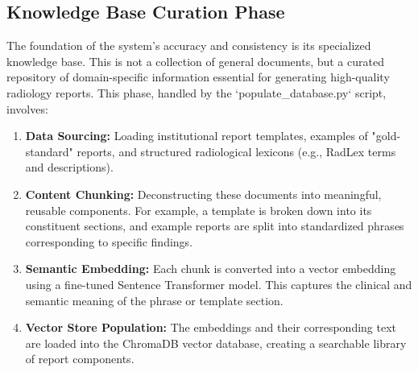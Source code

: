 \subsection{Knowledge Base Curation Phase}
The foundation of the system's accuracy and consistency is its specialized knowledge base. This is not a collection of general documents, but a curated repository of domain-specific information essential for generating high-quality radiology reports. This phase, handled by the `populate\_database.py` script, involves:
\begin{enumerate}
    \item \textbf{Data Sourcing:} Loading institutional report templates, examples of "gold-standard" reports, and structured radiological lexicons (e.g., RadLex terms and descriptions).
    \item \textbf{Content Chunking:} Deconstructing these documents into meaningful, reusable components. For example, a template is broken down into its constituent sections, and example reports are split into standardized phrases corresponding to specific findings.
    \item \textbf{Semantic Embedding:} Each chunk is converted into a vector embedding using a fine-tuned Sentence Transformer model. This captures the clinical and semantic meaning of the phrase or template section.
    \item \textbf{Vector Store Population:} The embeddings and their corresponding text are loaded into the ChromaDB vector database, creating a searchable library of report components.
\end{enumerate}

